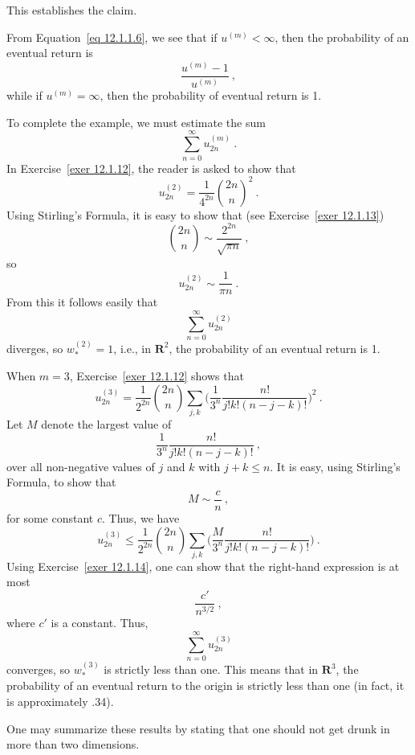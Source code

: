 \begin{example}
This establishes the claim.
\par
From Equation~\ref{eq 12.1.1.6}, we see that if $u^{(m)} < \infty$, then the probability of an
eventual return is
$$\frac {u^{(m)} - 1}{u^{(m)}}\ ,$$
while if $u^{(m)} = \infty$, then the probability of eventual return is 1.
\par
To complete the example, we must estimate the sum
$$\sum_{n = 0}^\infty u^{(m)}_{2n}\ .$$  
In Exercise~\ref{exer 12.1.12}, the reader is asked to show that
$$u^{(2)}_{2n} = \frac 1 {4^{2n}} {{2n}\choose n}^2\ .$$
Using Stirling's Formula, it is easy to show that (see Exercise~\ref{exer 12.1.13})
$${{2n}\choose n} \sim \frac {2^{2n}}{\sqrt {\pi n}}\ ,$$
so
$$u^{(2)}_{2n} \sim \frac 1{\pi n}\ .$$
From this it follows easily that
$$\sum_{n = 0}^\infty u^{(2)}_{2n}$$
diverges, so $w^{(2)}_* = 1$, i.e., in ${\mathbf R}^2$, the probability of an eventual return is
1.
\par
When $m = 3$, Exercise~\ref{exer 12.1.12} shows that
$$u^{(3)}_{2n} = \frac 1{2^{2n}}{{2n}\choose n} \sum_{j,k} 
\biggl(\frac 1{3^n}\frac{n!}{j!k!(n-j-k)!}\biggr)^2\ .$$
Let $M$ denote the largest value of 
$$\frac 1{3^n}\frac {n!}{j!k!(n - j - k)!}\ ,$$
over all non-negative values of $j$ and $k$ with $j + k \le n$.  It is easy, using Stirling's
Formula, to show that 
$$M \sim \frac cn\ ,$$
for some constant $c$.  Thus, we have
$$u^{(3)}_{2n} \le \frac 1{2^{2n}}{{2n}\choose n} \sum_{j,k} 
\biggl(\frac M{3^n}\frac{n!}{j!k!(n-j-k)!}\biggr)\ .$$
Using Exercise~\ref{exer 12.1.14}, one can show that the right-hand expression is at most
$$\frac {c'}{n^{3/2}}\ ,$$
where $c'$ is a constant.  Thus,
$$\sum_{n = 0}^\infty u^{(3)}_{2n}$$
converges, so $w^{(3)}_*$ is strictly less than one.  This means that in ${\mathbf R}^3$, the
probability of an eventual return to the origin is strictly less than one (in fact, it is
approximately .34).
\par
One may summarize these results by stating that one should not get drunk in more than two
dimensions.
\end{example}

